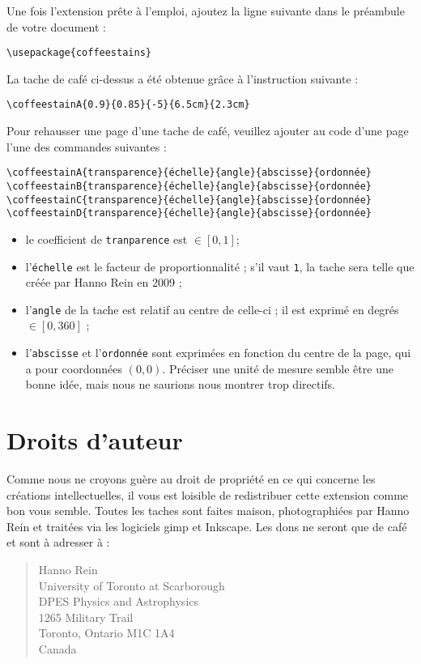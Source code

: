 \documentclass[a4paper, 11pt, BCOR = 0 pt, DIV = 13, oneside]{scrartcl}
\begin{document}
Une fois l'extension prête à l'emploi, ajoutez la ligne suivante dans le
préambule de votre document :
\begin{verbatim}
\usepackage{coffeestains}
\end{verbatim}
\vfill{}

\begin{tcolorbox}
  La tache de café ci-dessus a été obtenue grâce à l'instruction suivante :

  \verb|\coffeestainA{0.9}{0.85}{-5}{6.5cm}{2.3cm}|
\end{tcolorbox}
\newpage{}
\label{stainB}

Pour rehausser une page d'une tache de café, veuillez ajouter au code d'une page
l'une des commandes suivantes :
\begin{verbatim}
\coffeestainA{transparence}{échelle}{angle}{abscisse}{ordonnée}
\coffeestainB{transparence}{échelle}{angle}{abscisse}{ordonnée}
\coffeestainC{transparence}{échelle}{angle}{abscisse}{ordonnée}
\coffeestainD{transparence}{échelle}{angle}{abscisse}{ordonnée}
\end{verbatim}

\begin{itemize}
\item le coefficient de \texttt{tranparence} est $\in [0,1]$;
\item l'\texttt{échelle} est le facteur de proportionnalité ; s'il vaut \texttt{1},
  la tache sera telle que créée par Hanno Rein en 2009 ;
\item l'\texttt{angle} de la tache est relatif au centre de celle-ci ; il est exprimé en
  degrés $\in [0,360]$ ;
\item l'\texttt{abscisse} et l'\texttt{ordonnée} sont exprimées en
  fonction du centre de la page, qui a pour coordonnées $(0, 0)$. Préciser une
  unité de mesure semble être une bonne idée, mais nous ne saurions nous montrer
  trop directifs.
\end{itemize}

\section{Droits d'auteur}
Comme nous ne croyons guère au droit de propriété en ce qui concerne les
créations intellectuelles, il vous est loisible de redistribuer cette extension
comme bon vous semble. Toutes les taches sont faites maison, photographiées par
Hanno Rein et traitées via les logiciels gimp et Inkscape. Les dons ne seront
que de café et sont à adresser à :
\begin{quote}
Hanno Rein\\
University of Toronto at Scarborough\\
DPES Physics and Astrophysics\\
1265 Military Trail\\
Toronto, Ontario M1C 1A4\\
Canada
\end{quote}
\end{document}
